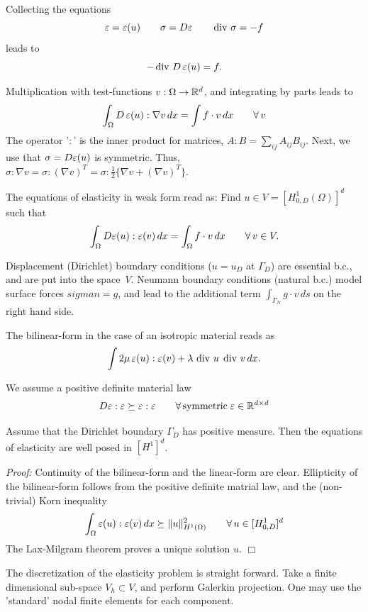 Collecting the equations
$$
\varepsilon = \varepsilon(u) \qquad \sigma = D \varepsilon \qquad \operatorname{div} \, \sigma = -f
$$
leads to
$$
-\operatorname{div} \, D \, \varepsilon(u) = f.
$$
\bigskip

Multiplication with test-functions $v : \Omega \rightarrow {\mathbb R}^d$, and integrating by parts 
leads to
$$
\int_\Omega D \, \varepsilon(u) : \nabla v \, dx = \int f \cdot v \, dx \qquad \forall \, v 
$$
The operator '$:$' is the inner product for matrices, $A:B = \sum_{ij} A_{ij} B_{ij}$.
Next, we use that $\sigma = D \varepsilon(u)$ is symmetric. Thus, $\sigma : \nabla v = \sigma : (\nabla v)^T = \sigma : \frac{1}{2} \{ \nabla v + (\nabla v)^T \}$. 

\bigskip

The equations of elasticity in weak form read as: Find $u \in V = [H_{0,D}^1(\Omega)]^d$
such that
$$
\int_\Omega D \varepsilon(u) : \varepsilon(v) \, dx = \int_\Omega f \cdot v \, dx \qquad \forall \, v \in V.
$$

Displacement (Dirichlet) boundary conditions ($u = u_D$ at $\Gamma_D$) are essential b.c., 
and are put into the
space~$V$. Neumann boundary conditions (natural b.c.) model surface forces $sigma n = g$,
and lead to the additional term $\int_{\Gamma_N} g \cdot v \, ds$ on the right hand side.

\bigskip

The bilinear-form in the case of an isotropic material reads as
$$
\int 2 \mu \, \varepsilon(u) : \varepsilon(v)  + \lambda \, \operatorname{div} \, u \; \operatorname{div} \, v \, dx.
$$


We assume a positive definite material law 
$$
D \varepsilon : \varepsilon \succeq \varepsilon : \varepsilon \qquad \forall \, \mbox{symmetric} \; \varepsilon \in {\mathbb R}^{d\times d}
$$
\begin{theorem} Assume that the Dirichlet boundary $\Gamma_D$ has positive measure.
Then the equations of elasticity are well posed in $[H^1]^d$.
\end{theorem}
{\em Proof:} Continuity of the bilinear-form and the linear-form are clear.
Ellipticity of the bilinear-form follows from the positive definite matrial law, and 
the (non-trivial) Korn inequality
$$
\int_\Omega \varepsilon(u) : \varepsilon (v) \, dx \succeq \| u \|_{H^1(\Omega)}^2 \qquad \forall \, u \in [H_{0,D}^1]^d
$$
The Lax-Milgram theorem proves a unique solution $u$.
\hfill $\Box$

\bigskip

The discretization of the elasticity problem is straight forward. Take a finite dimensional
sub-space $V_h \subset V$, and perform Galerkin projection. One may use the 'standard'
nodal finite elements for each component. 

